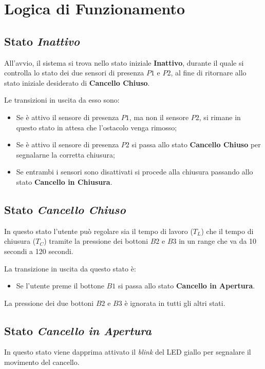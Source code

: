 \section{Logica di Funzionamento}

\subsection{Stato \textit{Inattivo}}
All'avvio, il sistema si trova nello stato iniziale \textbf{Inattivo}, durante il quale si controlla lo stato dei due sensori di presenza $P1$ e $P2$, al fine di ritornare allo stato iniziale desiderato di \textbf{Cancello Chiuso}.

\noindent Le transizioni in uscita da esso sono:
\begin{itemize}
    \item Se è attivo il sensore di presenza $P1$, ma non il sensore $P2$, si rimane in questo stato in attesa che l'ostacolo venga rimosso;
    \item Se è attivo il sensore di presenza $P2$ si passa allo stato \textbf{Cancello Chiuso} per segnalarne la corretta chiusura;
    \item Se entrambi i sensori sono disattivati si procede alla chiusura passando allo stato \textbf{Cancello in Chiusura}.
\end{itemize}


\subsection{Stato \textit{Cancello Chiuso}}
In questo stato l'utente può regolare sia il tempo di lavoro ($T_L$) che il tempo di chiusura ($T_C$) tramite la pressione dei bottoni $B2$ e $B3$ in un range che va da 10 secondi a 120 secondi.

\noindent La transizione in uscita da questo stato è:
\begin{itemize}
    \item Se l'utente preme il bottone $B1$ si passa allo stato \textbf{Cancello in Apertura}.
\end{itemize} 

\noindent La pressione dei due bottoni $B2$ e $B3$ è ignorata in tutti gli altri stati.


\subsection{Stato \textit{Cancello in Apertura}}
In questo stato viene dapprima attivato il \textit{blink} del LED giallo per segnalare il movimento del cancello.

